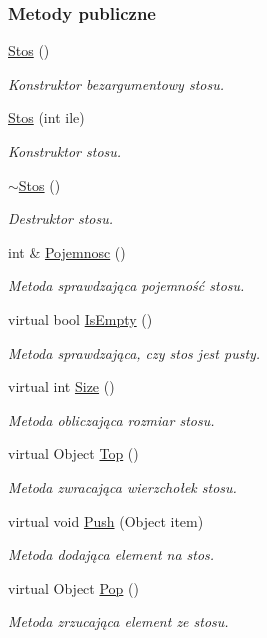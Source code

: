 \subsubsection*{Metody publiczne}
\begin{DoxyCompactItemize}
\item 
\hyperlink{class_stos_aeeaa5309f8451f8eb81c85a6ffe158c8}{Stos} ()
\begin{DoxyCompactList}\small\item\em Konstruktor bezargumentowy stosu. \end{DoxyCompactList}\item 
\hyperlink{class_stos_a008cbd24801097067a5c8c5c447ea860}{Stos} (int ile)
\begin{DoxyCompactList}\small\item\em Konstruktor stosu. \end{DoxyCompactList}\item 
\hyperlink{class_stos_a8ff945301446bcebb9538efc395499bc}{$\sim$\-Stos} ()
\begin{DoxyCompactList}\small\item\em Destruktor stosu. \end{DoxyCompactList}\item 
int \& \hyperlink{class_stos_a1ea728d6c770ffa6b06cf74d1d0ac78f}{Pojemnosc} ()
\begin{DoxyCompactList}\small\item\em Metoda sprawdzająca pojemność stosu. \end{DoxyCompactList}\item 
virtual bool \hyperlink{class_stos_abc1fbf4ecba79d7d88e6f80e069315f5}{Is\-Empty} ()
\begin{DoxyCompactList}\small\item\em Metoda sprawdzająca, czy stos jest pusty. \end{DoxyCompactList}\item 
virtual int \hyperlink{class_stos_a54058e5bf9a0f981cbc82f7cb130f565}{Size} ()
\begin{DoxyCompactList}\small\item\em Metoda obliczająca rozmiar stosu. \end{DoxyCompactList}\item 
virtual Object \hyperlink{class_stos_af7be7c7dd2e137e619c8497025119ad5}{Top} ()
\begin{DoxyCompactList}\small\item\em Metoda zwracająca wierzchołek stosu. \end{DoxyCompactList}\item 
virtual void \hyperlink{class_stos_aa149141113dd5b156f21518a9a1e6c8e}{Push} (Object item)
\begin{DoxyCompactList}\small\item\em Metoda dodająca element na stos. \end{DoxyCompactList}\item 
virtual Object \hyperlink{class_stos_aa4b761d3581113ee3cf312a501ed115a}{Pop} ()
\begin{DoxyCompactList}\small\item\em Metoda zrzucająca element ze stosu. \end{DoxyCompactList}\end{DoxyCompactItemize}



